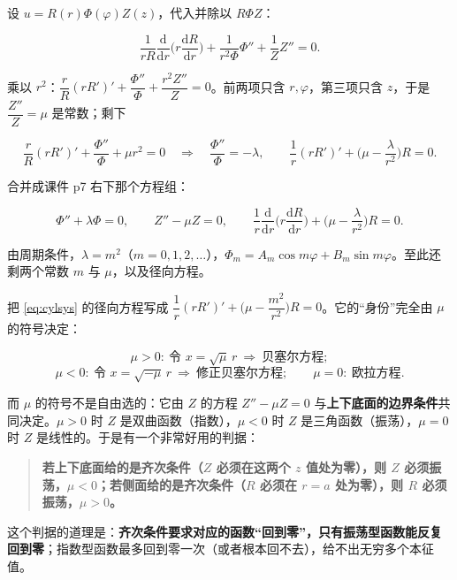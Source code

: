 设 $u=R(r)\Phi(\varphi)Z(z)$，代入并除以 $R\Phi Z$：

\[
\frac1{rR}\frac{\mathrm d}{\mathrm dr}\Big(r\frac{\mathrm dR}{\mathrm dr}\Big)+\frac1{r^2\Phi}\Phi''+\frac1Z Z''=0 .
\]

乘以 $r^2$：$\dfrac{r}{R}(rR')'+\dfrac{\Phi''}{\Phi}+\dfrac{r^2Z''}{Z}=0$。前两项只含 $r,\varphi$，第三项只含 $z$，于是 $\dfrac{Z''}{Z}=\mu$ 是常数；剩下

\[
\frac{r}{R}(rR')'+\frac{\Phi''}{\Phi}+\mu r^2=0
\quad\Longrightarrow\quad
\frac{\Phi''}{\Phi}=-\lambda,\qquad
\frac1r(rR')'+\Big(\mu-\frac{\lambda}{r^2}\Big)R=0 .
\]

合并成课件 p7 右下那个方程组：

\begin{equation}
\Phi''+\lambda\Phi=0,
\qquad
Z''-\mu Z=0,
\qquad
\frac1r\frac{\mathrm d}{\mathrm dr}\Big(r\frac{\mathrm dR}{\mathrm dr}\Big)+\Big(\mu-\frac{\lambda}{r^2}\Big)R=0 .
\label{eq:cylsys}
\end{equation}

由周期条件，$\lambda=m^2$（$m=0,1,2,\dots$），$\Phi_m=A_m\cos m\varphi+B_m\sin m\varphi$。至此还剩两个常数 $m$ 与 $\mu$，以及径向方程。


把 \eqref{eq:cylsys} 的径向方程写成 $\dfrac1r(rR')'+\Big(\mu-\dfrac{m^2}{r^2}\Big)R=0$。它的“身份”完全由 $\mu$ 的符号决定：

\[
\mu>0:\ \text{令 }x=\sqrt\mu\,r\ \Rightarrow\ \text{贝塞尔方程};
\]
\[
\mu<0:\ \text{令 }x=\sqrt{-\mu}\,r\ \Rightarrow\ \text{修正贝塞尔方程};
\qquad
\mu=0:\ \text{欧拉方程}.
\]

而 $\mu$ 的符号不是自由选的：它由 $Z$ 的方程 $Z''-\mu Z=0$ 与\textbf{上下底面的边界条件}共同决定。$\mu>0$ 时 $Z$ 是双曲函数（指数），$\mu<0$ 时 $Z$ 是三角函数（振荡），$\mu=0$ 时 $Z$ 是线性的。于是有一个非常好用的判据：

\begin{quote}
\textbf{若上下底面给的是齐次条件（$Z$ 必须在这两个 $z$ 值处为零），则 $Z$ 必须振荡，$\mu<0$；若侧面给的是齐次条件（$R$ 必须在 $r=a$ 处为零），则 $R$ 必须振荡，$\mu>0$。}
\end{quote}

这个判据的道理是：\textbf{齐次条件要求对应的函数“回到零”，只有振荡型函数能反复回到零}；指数型函数最多回到零一次（或者根本回不去），给不出无穷多个本征值。


